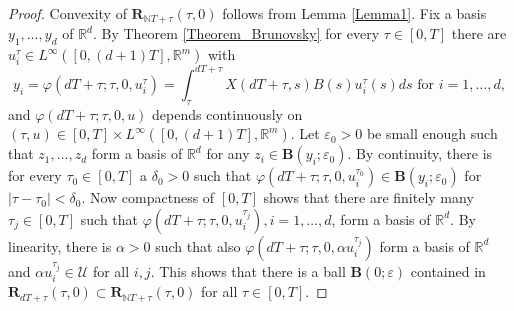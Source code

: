 \documentclass{siamltex}%
\begin{document}
\begin{proof}
Convexity of $\mathbf{R}_{\mathbb{N}T+\tau}(\tau,0)$ follows from Lemma
\ref{Lemma1}. Fix a basis $y_{1},\ldots,y_{d}$ of $\mathbb{R}^{d}$. By Theorem
\ref{Theorem_Brunovsky} for every $\tau\in\left[  0,T\right]  $ there are
$u_{i}^{\tau}\in L^{\infty}([0,(d+1)T],\mathbb{R}^{m})$ with%
\[
y_{i}=\varphi(dT+\tau;\tau,0,u_{i}^{\tau})=\int_{\tau}^{dT+\tau}%
X(dT+\tau,s)B(s)u_{i}^{\tau}(s)ds\text{ for }i=1,\ldots,d,
\]
and $\varphi(dT+\tau;\tau,0,u)$ depends continuously on $(\tau,u)\in\left[
0,T\right]  \times L^{\infty}([0,(d+1)T],\mathbb{R}^{m})$. Let $\varepsilon
_{0}>0$ be small enough such that $z_{1},\ldots,z_{d}$ form a basis of
$\mathbb{R}^{d}$ for any $z_{i}\in\mathbf{B}(y_{i};\varepsilon_{0})$. By
continuity, there is for every $\tau_{0}\in\left[  0,T\right]  $ a $\delta
_{0}>0$ such that $\varphi(dT+\tau;\tau,0,u_{i}^{\tau_{0}})\in\mathbf{B}%
(y_{i};\varepsilon_{0})$ for $\left\vert \tau-\tau_{0}\right\vert <\delta_{0}%
$. Now compactness of $\left[  0,T\right]  $ shows that there are finitely
many $\tau_{j}\in\left[  0,T\right]  $ such that $\varphi(dT+\tau;\tau
,0,u_{i}^{\tau_{j}}),i=1,\ldots,d$, form a basis of $\mathbb{R}^{d}$. By
linearity, there is $\alpha>0$ such that also $\varphi(dT+\tau;\tau,0,\alpha
u_{i}^{\tau_{j}})$ form a basis of $\mathbb{R}^{d}$ and $\alpha u_{i}%
^{\tau_{j}}\in\mathcal{U}$ for all $i,j$. This shows that there is a ball
$\mathbf{B}(0;\varepsilon)$ contained in $\mathbf{R}_{dT+\tau}(\tau
,0)\subset\mathbf{R}_{\mathbb{N}T+\tau}(\tau,0)$ for all $\tau\in\left[
0,T\right]  $.


\end{proof}
\end{document}
